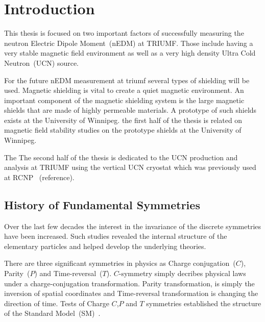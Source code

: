 \chapter{Introduction\label{chap:intro}}
\renewcommand{\thepage}{\arabic{page}}%
\setcounter{page}{1}%



This thesis is focused on two important factors of successfully
measuring the neutron Electric Dipole Moment~(nEDM) at TRIUMF. Those
include having a very stable magnetic field environment as well as a
very high density Ultra Cold Neutron~(UCN) source.

For the future nEDM measurement at triumf several types of shielding
will be used.  Magnetic shielding is vital to create a quiet magnetic
environment. An important component of the magnetic shielding system
is the large magnetic shields that are made of highly permeable
materials. A prototype of such shields exists at the University of
Winnipeg. the first half of the thesis is related on magnetic field
stability studies on the prototype shields at the University of
Winnipeg.

The The second half of the thesis is dedicated to the UCN production
and analysis at TRIUMF using the vertical UCN cryostat which was
previously used at RCNP ~(reference).
 



\section{History of Fundamental Symmetries }

Over the last few decades the interest in the invariance of the
discrete symmetries have been increased. Such studies revealed the
internal structure of the elementary particles and helped develop the
underlying theories.

There are three significant symmetries in physics as Charge
conjugation~($C$), Parity~($P$) and Time-reversal~($T$). $C$-symmetry simply
decribes physical laws under a charge-conjugation
transformation. Parity transformation, is simply the inversion of
spatial coordinates and Time-reversal transformation is changing the
direction of time.
Tests of Charge $C$,$P$ and $T$ symmetries established the structure
of the Standard Model~(SM)~\cite{pospelov2005electric}.  \\

